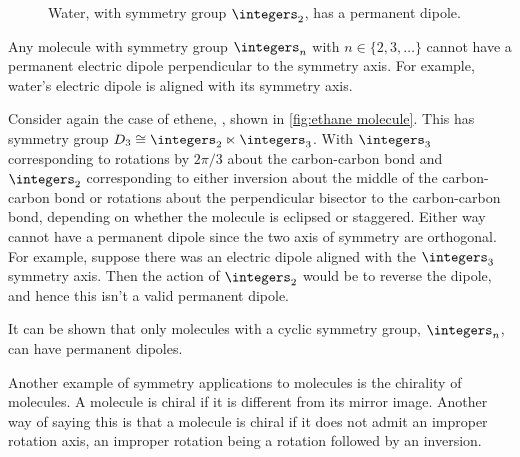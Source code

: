 \begin{figure}
    \caption{Water, with symmetry group \(\integers_2\), has a permanent dipole.}
    \label{fig:water}
\end{figure}

Any molecule with symmetry group \(\integers_n\) with \(n \in \{2, 3, \dotsc\}\) cannot have a permanent electric dipole perpendicular to the symmetry axis.
For example, water's electric dipole is aligned with its symmetry axis.

Consider again the case of ethene, , shown in \cref{fig:ethane molecule}.
This has symmetry group \(D_3 \isomorphic \integers_2 \ltimes \integers_3\).
With \(\integers_3\) corresponding to rotations by \(2\pi/3\) about the carbon-carbon bond and \(\integers_2\) corresponding to either inversion about the middle of the carbon-carbon bond or rotations about the perpendicular bisector to the carbon-carbon bond, depending on whether the molecule is eclipsed or staggered.
Either way  cannot have a permanent dipole since the two axis of symmetry are orthogonal.
For example, suppose there was an electric dipole aligned with the \(\integers_3\) symmetry axis.
Then the action of \(\integers_2\) would be to reverse the dipole, and hence this isn't a valid permanent dipole.

It can be shown that only molecules with a cyclic symmetry group, \(\integers_n\), can have permanent dipoles.

Another example of symmetry applications to molecules is the chirality of molecules.
A molecule is chiral if it is different from its mirror image.
Another way of saying this is that a molecule is chiral if it does not admit an improper rotation axis, an improper rotation being a rotation followed by an inversion.

